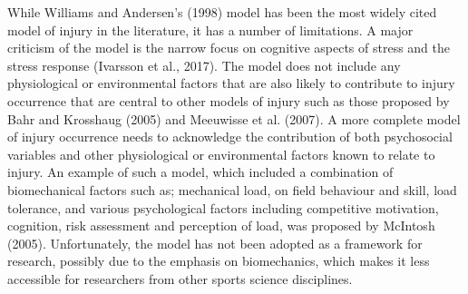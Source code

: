 \documentclass[man,floatsintext]{apa6}
\begin{document}
While Williams and Andersen's (1998) model has been the most widely cited model of injury in the literature, it has a number of limitations.
A major criticism of the model is the narrow focus on cognitive aspects of stress and the stress response (Ivarsson et al., 2017).
The model does not include any physiological or environmental factors that are also likely to contribute to injury occurrence that are central to other models of injury such as those proposed by Bahr and Krosshaug (2005) and Meeuwisse et al. (2007).
A more complete model of injury occurrence needs to acknowledge the contribution of both psychosocial variables and other physiological or environmental factors known to relate to injury.
An example of such a model, which included a combination of biomechanical factors such as; mechanical load, on field behaviour and skill, load tolerance, and various psychological factors including competitive motivation, cognition, risk assessment and perception of load, was proposed by McIntosh (2005).
Unfortunately, the model has not been adopted as a framework for research, possibly due to the emphasis on biomechanics, which makes it less accessible for researchers from other sports science disciplines.
\end{document}

